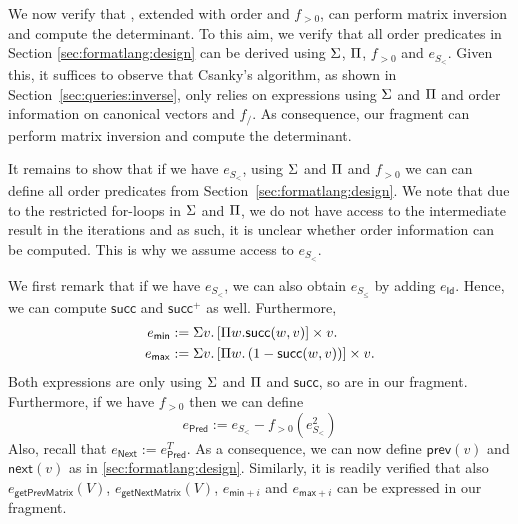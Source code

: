 
We now verify that \langmprod, extended with order and $f_{>0}$, 
can perform matrix inversion and compute the determinant. To this aim, we verify that all order
predicates in Section \ref{sec:formatlang:design} can be derived using $\Sigma$, $\Pi$, $f_{>0}$ and 
$e_{S_{<}}$. Given this, it suffices to observe that Csanky's algorithm, as shown in Section~\ref{sec:queries:inverse}, only relies on expressions using $\Sigma$ and $\Pi$ and order information on canonical vectors and $f_/$.
As consequence, our fragment can perform matrix inversion and compute the determinant.


It remains to show that if we have $e_{S_{<}}$, using $\Sigma$ and $\Pi$ and $f_{>0}$ we can
can define all order predicates from Section~\ref{sec:formatlang:design}. We note that due to the restricted for-loops
in $\Sigma$ and $\Pi$, we do not have access to the intermediate
result in the iterations and as such, it is unclear whether order information can be computed. This is why
we assume access to $e_{S_<}$.

We first remark that if we have $e_{S_{<}}$, we can also obtain
 $e_{S_{\leq}}$ by adding $e_{\mathsf{Id}}$. Hence,
we can compute $\mathsf{succ}$ and $\mathsf{succ}^+$ as well. Furthermore, 
\begin{align*}
  e_{\mathsf{min}}&:=\Sigma v. \left[ \Pi w. \mathsf{succ}(w,v)\right] \times v. \\
  e_{\mathsf{max}}&:=\Sigma v. \left[ \Pi w. \left( 1-\mathsf{succ}(w,v) \right) \right] \times v.
\end{align*}
Both expressions are only using $\Sigma$ and $\Pi$ and $\mathsf{succ}$, so are in our fragment.
Furthermore, if we have $f_{>0}$ then we can define
$$
e_{\mathsf{Pred}}:= e_{S_{<}}- f_{>0}(e_{S_{<}}^2)
$$
Also, recall that  $e_{\mathsf{Next}}:=e_{\mathsf{Pred}}^T$. As a consequence, 
we can now define $\mathsf{prev}(v)$ and $\mathsf{next}(v)$ as in \ref{sec:formatlang:design}. Similarly,
it is readily verified that also $e_{\mathsf{getPrevMatrix}}(V)$,
$e_{\mathsf{getNextMatrix}}(V)$, $e_{\mathsf{min}+i}$ and $e_{\mathsf{max}+i}$ can be expressed
in our fragment.
